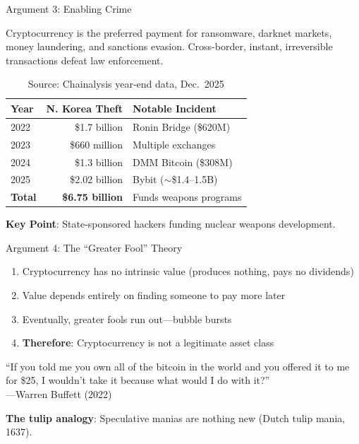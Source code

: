 ﻿\documentclass[aspectratio=169,11pt]{beamer}
\begin{document}
\begin{frame}{Argument 3: Enabling Crime}
\begin{argumentbox}
Cryptocurrency is the preferred payment for ransomware, darknet markets, money laundering, and sanctions evasion. Cross-border, instant, irreversible transactions defeat law enforcement.
\end{argumentbox}

\vspace{-0.2em}
\begin{table}[h]
\centering
\scriptsize
\begin{tabular}{@{}lrl@{}}
\toprule
\textbf{Year} & \textbf{N. Korea Theft} & \textbf{Notable Incident} \\
\midrule
2022 & \$1.7 billion & Ronin Bridge (\$620M) \\
2023 & \$660 million & Multiple exchanges \\
2024 & \$1.3 billion & DMM Bitcoin (\$308M) \\
2025 & \$2.02 billion & Bybit ($\sim$\$1.4--1.5B) \\
\midrule
\textbf{Total} & \textbf{\$6.75 billion} & Funds weapons programs \\
\bottomrule
\end{tabular}
\caption{\scriptsize Source: Chainalysis year-end data, Dec.\ 2025}
\end{table}
\vspace{-0.5em}
{\small \textbf{Key Point}: State-sponsored hackers funding nuclear weapons development.}
\end{frame}

\begin{frame}{Argument 4: The ``Greater Fool'' Theory}
\begin{argumentbox}
\small
\begin{enumerate}
    \item Cryptocurrency has no intrinsic value (produces nothing, pays no dividends)
    \item Value depends entirely on finding someone to pay more later
    \item Eventually, greater fools run out---bubble bursts
    \item \textbf{Therefore}: Cryptocurrency is not a legitimate asset class
\end{enumerate}
\end{argumentbox}

\vspace{0.2em}
\begin{quotebox}
\small
``If you told me you own all of the bitcoin in the world and you offered it to me for \$25, I wouldn't take it because what would I do with it?''\\
\hfill---Warren Buffett (2022)
\end{quotebox}

\textbf{The tulip analogy}: Speculative manias are nothing new (Dutch tulip mania, 1637).
\end{frame}
\end{document}
